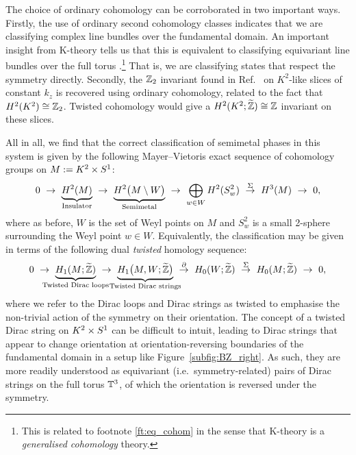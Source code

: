 The choice of ordinary cohomology can be corroborated in two important ways. Firstly, the use of ordinary second cohomology classes indicates that we are classifying complex line bundles over the fundamental domain. An important insight from K-theory tells us that this is equivalent to classifying equivariant line bundles over the full torus \parencite[Proposition 2.1]{Segal_K-theory}.\footnote{
	This is related to footnote \ref{ft:eq_cohom} in the sense that K-theory is a \emph{generalised cohomology} theory.}
That is, we are classifying states that respect the symmetry directly. Secondly, the $\mathbb{Z}_2$ invariant found in Ref.~\cite{Fonseca-Vaidya_nonorientable} on $K^2$-like slices of constant $k_z$ is recovered using ordinary cohomology, related to the fact that $H^2(K^2)\cong\mathbb{Z}_2$. Twisted cohomology would give a $H^2(K^2;\widetilde{\mathbb{Z}})\cong\mathbb{Z}$ invariant on these slices.

All in all, we find that the correct classification of semimetal phases in this system is given by the following Mayer--Vietoris exact sequence of cohomology groups on $M := K^2\times S^1$:
\begin{equation}\label{eq:MV-nonorientable}
	0\ \to\ \underbrace{H^2(M)}_{\mathclap{\text{Insulator}}}\ \to\ \underbrace{H^2\big(M\setminus W\big)}_{\mathclap{\text{Semimetal}}}\ \to\ \bigoplus_{w\in W} H^2(S_w^2)\ \overset{\Sigma}{\to}\ H^3(M)\ \to\ 0,
\end{equation}
where as before, $W$ is the set of Weyl points on $M$ and $S_w^2$ is a small 2-sphere surrounding the Weyl point $w\in W$. Equivalently, the classification may be given in terms of the following dual \emph{twisted} homology sequence:
\begin{equation}\label{eq:homology-sequence-nonorientable}
	0\ \to\ \underbrace{H_1(M;\ext{\Z})}_{\mathclap{\text{Twisted Dirac loops}}}\ \to\ \underbrace{H_1\big(M, W;\ext{\Z}\big)}_{\mathclap{\text{Twisted Dirac strings}}}\ \overset{\partial}{\to}\ H_0(W;\ext{\Z})\ \overset{\Sigma}{\to}\ H_0(M;\ext{\Z})\ \to\ 0,
\end{equation}
where we refer to the Dirac loops and Dirac strings as twisted to emphasise the non-trivial action of the symmetry on their orientation. The concept of a twisted Dirac string on $K^2\times S^1$ can be difficult to intuit, leading to Dirac strings that appear to change orientation at orientation-reversing boundaries of the fundamental domain in a setup like Figure~\ref{subfig:BZ_right}. As such, they are more readily understood as equivariant (i.e.\ symmetry-related) pairs of Dirac strings on the full torus $\mathbb{T}^3$, of which the orientation is reversed under the symmetry.

